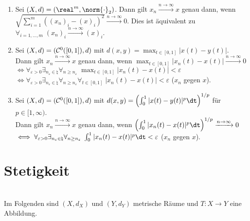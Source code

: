 \begin{Bsp}
    \begin{enumerate}[label=\emph{(\alph*)}]
        \item
        Sei $(X, d) = (\real^m, \norm{\cdot}_2)$.
        Dann gilt $x_n \xrightarrow{n \to \infty} x$ genau dann, wenn\\
        $\sqrt{\sum_{i=1}^m ((x_n)_i - (x)_i)^2} \xrightarrow{n \to \infty} 0$.
        Dies ist äquivalent zu $\forall_{i=1,\dotsc,m}\; (x_n)_i \xrightarrow{n \to \infty} (x)_i$.

        \item
        Sei $(X, d) = (\mathcal{C}^0([0, 1]), d)$ mit $d(x, y) = \max_{t \in [0, 1]} |x(t) - y(t)|$.\\
        Dann gilt $x_n \xrightarrow{n \to \infty} x$ genau dann, wenn
        $\max_{t \in [0, 1]} |x_n(t) - x(t)| \xrightarrow{n \to \infty} 0$\\
        $\iff \forall_{\varepsilon > 0} \exists_{n_\varepsilon \in \natural}
        \forall_{n \ge n_\varepsilon}\; \max_{t \in [0, 1]} |x_n(t) - x(t)| < \varepsilon$\\
        $\iff \forall_{\varepsilon > 0} \exists_{n_\varepsilon \in \natural}
        \forall_{n \ge n_\varepsilon} \forall_{t \in [0, 1]}\; |x_n(t) - x(t)| < \varepsilon$
        ($x_n$  gegen $x$).

        \item
        Sei $(X, d) = (\mathcal{C}^0([0, 1]), d)$ mit
        $d(x, y) = \left(\int_0^1 |x(t) - y(t)|^p \dt\right)^{1/p}$ für $p \in [1, \infty)$.\\
        Dann gilt $x_n \xrightarrow{n \to \infty} x$ genau dann, wenn
        $\left(\int_0^1 |x_n(t) - x(t)|^p \dt\right)^{1/p} \xrightarrow{n \to \infty} 0$\\
        $\iff \forall_{\varepsilon > 0} \exists_{n_\varepsilon \in \natural}
        \forall_{n \ge n_\varepsilon}\; \int_0^1 |x_n(t) - x(t)|^p\dt < \varepsilon$
        ($x_n$  gegen $x$).
    \end{enumerate}
\end{Bsp}

\section{%
    Stetigkeit%
}

\begin{Bem}\\
    Im Folgenden sind $(X, d_X)$ und $(Y, d_Y)$ metrische Räume und
    $T\colon X \rightarrow Y$ eine Abbildung.
\end{Bem}

